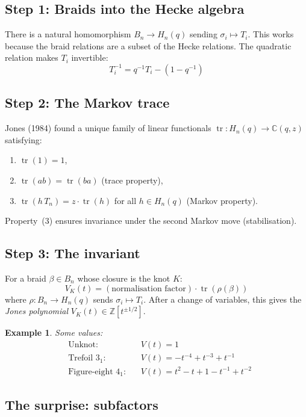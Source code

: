 \documentclass[12pt]{article}
\newtheorem{example}[theorem]{Example}
\DeclareMathOperator{\tr}{tr}
\begin{document}
\subsection{Step 1: Braids into the Hecke algebra}

There is a natural homomorphism $B_n \to H_n(q)$ sending
$\sigma_i \mapsto T_i$. This works because the braid relations are a
subset of the Hecke relations. The quadratic relation makes $T_i$
invertible:
\[
  T_i^{-1} = q^{-1} T_i - (1 - q^{-1})
\]

\subsection{Step 2: The Markov trace}

Jones (1984) found a unique family of linear functionals
$\tr : H_n(q) \to \mathbb{C}(q, z)$ satisfying:
\begin{enumerate}
  \item $\tr(1) = 1$,
  \item $\tr(ab) = \tr(ba)$ \quad (trace property),
  \item $\tr(h\, T_n) = z \cdot \tr(h)$ for all $h \in H_n(q)$
    \quad (Markov property).
\end{enumerate}
Property~(3) ensures invariance under the second Markov move
(stabilisation).

\subsection{Step 3: The invariant}

For a braid $\beta \in B_n$ whose closure is the knot $K$:
\[
  V_K(t) = (\text{normalisation factor}) \cdot \tr\!\left(\rho(\beta)\right)
\]
where $\rho : B_n \to H_n(q)$ sends $\sigma_i \mapsto T_i$.
After a change of variables, this gives the
\emph{Jones polynomial} $V_K(t) \in \mathbb{Z}[t^{\pm 1/2}]$.

\begin{example}
Some values:
\begin{align*}
  &\text{Unknot:}       && V(t) = 1 \\
  &\text{Trefoil } 3_1: && V(t) = -t^{-4} + t^{-3} + t^{-1} \\
  &\text{Figure-eight } 4_1: && V(t) = t^2 - t + 1 - t^{-1} + t^{-2}
\end{align*}
\end{example}

\subsection{The surprise: subfactors}
\end{document}
